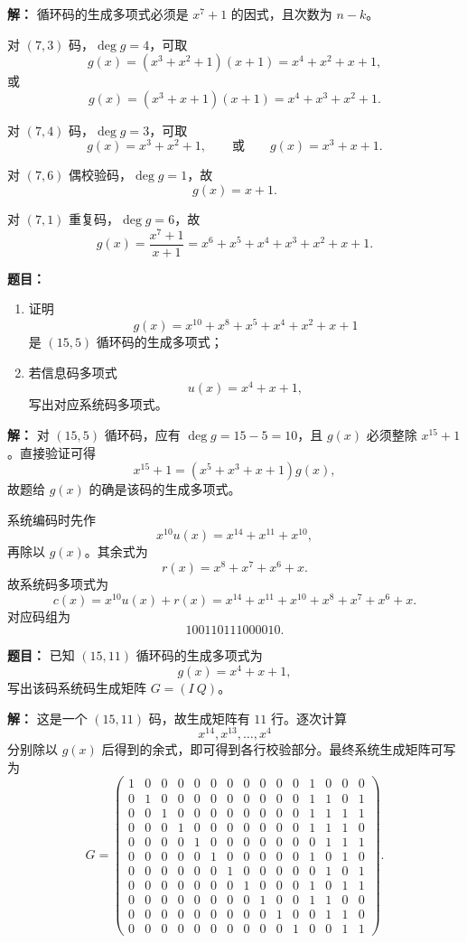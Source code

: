 \par\textbf{解：}
循环码的生成多项式必须是 $x^7+1$ 的因式，且次数为 $n-k$。

对 $(7,3)$ 码，$\deg g=4$，可取
\[
g(x)=(x^3+x^2+1)(x+1)=x^4+x^2+x+1,
\]
或
\[
g(x)=(x^3+x+1)(x+1)=x^4+x^3+x^2+1.
\]

对 $(7,4)$ 码，$\deg g=3$，可取
\[
g(x)=x^3+x^2+1,
\qquad \text{或}\qquad
g(x)=x^3+x+1.
\]

对 $(7,6)$ 偶校验码，$\deg g=1$，故
\[
g(x)=x+1.
\]

对 $(7,1)$ 重复码，$\deg g=6$，故
\[
g(x)=\frac{x^7+1}{x+1}=x^6+x^5+x^4+x^3+x^2+x+1.
\]

\medskip
{}
\textbf{题目：}
\begin{enumerate}
\item 证明
\[
g(x)=x^{10}+x^8+x^5+x^4+x^2+x+1
\]
是 $(15,5)$ 循环码的生成多项式；
\item 若信息码多项式
\[
u(x)=x^4+x+1,
\]
写出对应系统码多项式。
\end{enumerate}

\par\textbf{解：}
对 $(15,5)$ 循环码，应有 $\deg g=15-5=10$，且 $g(x)$ 必须整除 $x^{15}+1$。直接验证可得
\[
x^{15}+1=(x^5+x^3+x+1)g(x),
\]
故题给 $g(x)$ 的确是该码的生成多项式。

系统编码时先作
\[
x^{10}u(x)=x^{14}+x^{11}+x^{10},
\]
再除以 $g(x)$。其余式为
\[
r(x)=x^8+x^7+x^6+x.
\]
故系统码多项式为
\[
c(x)=x^{10}u(x)+r(x)
=x^{14}+x^{11}+x^{10}+x^8+x^7+x^6+x.
\]
对应码组为
\[
100110111000010.
\]

\medskip
{}
\textbf{题目：}
已知 $(15,11)$ 循环码的生成多项式为
\[
g(x)=x^4+x+1,
\]
写出该码系统码生成矩阵 $G=(I\ Q)$。

\par\textbf{解：}
这是一个 $(15,11)$ 码，故生成矩阵有 $11$ 行。逐次计算
\[
x^{14},x^{13},\dots,x^4
\]
分别除以 $g(x)$ 后得到的余式，即可得到各行校验部分。最终系统生成矩阵可写为
\[
G=
\begin{pmatrix}
1&0&0&0&0&0&0&0&0&0&0&1&0&0&0\\
0&1&0&0&0&0&0&0&0&0&0&1&1&0&1\\
0&0&1&0&0&0&0&0&0&0&0&1&1&1&1\\
0&0&0&1&0&0&0&0&0&0&0&1&1&1&0\\
0&0&0&0&1&0&0&0&0&0&0&0&1&1&1\\
0&0&0&0&0&1&0&0&0&0&0&1&0&1&0\\
0&0&0&0&0&0&1&0&0&0&0&0&1&0&1\\
0&0&0&0&0&0&0&1&0&0&0&1&0&1&1\\
0&0&0&0&0&0&0&0&1&0&0&1&1&0&0\\
0&0&0&0&0&0&0&0&0&1&0&0&1&1&0\\
0&0&0&0&0&0&0&0&0&0&1&0&0&1&1
\end{pmatrix}.
\]

